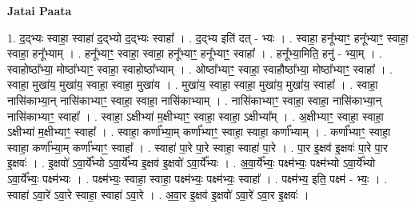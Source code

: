 \documentclass[17pt]{extarticle}
\begin{document}
\textbf{Jatai Paata} \newline

1. द॒द्भ्यः स्वाहा॒ स्वाहा॑ द॒द्भ्यो द॒द्भ्यः स्वाहा᳚ । . द॒द्भ्य इति॑ दत् - भ्यः । . स्वाहा॒ हनू᳚भ्याꣳ॒॒ हनू᳚भ्याꣳ॒॒ स्वाहा॒ स्वाहा॒ हनू᳚भ्याम् । . हनू᳚भ्याꣳ॒॒ स्वाहा॒ स्वाहा॒ हनू᳚भ्याꣳ॒॒ हनू᳚भ्याꣳ॒॒ स्वाहा᳚ । . हनू᳚भ्या॒मिति॒ हनु॑ - भ्या॒म् । . स्वाहोष्ठा᳚भ्या॒ मोष्ठा᳚भ्याꣳ॒॒ स्वाहा॒ स्वाहोष्ठा᳚भ्याम् । . ओष्ठा᳚भ्याꣳ॒॒ स्वाहा॒ स्वाहौष्ठा᳚भ्या॒ मोष्ठा᳚भ्याꣳ॒॒ स्वाहा᳚ । . स्वाहा॒ मुखा॑य॒ मुखा॑य॒ स्वाहा॒ स्वाहा॒ मुखा॑य । . मुखा॑य॒ स्वाहा॒ स्वाहा॒ मुखा॑य॒ मुखा॑य॒ स्वाहा᳚ । . स्वाहा॒ नासि॑काभ्या॒न् नासि॑काभ्याꣳ॒॒ स्वाहा॒ स्वाहा॒ नासि॑काभ्याम् । . नासि॑काभ्याꣳ॒॒ स्वाहा॒ स्वाहा॒ नासि॑काभ्या॒न् नासि॑काभ्याꣳ॒॒ स्वाहा᳚ । . स्वाहा॒ ऽक्षीभ्या॑ म॒क्षीभ्याꣳ॒॒ स्वाहा॒ स्वाहा॒ ऽक्षीभ्या᳚म् । . अ॒क्षीभ्याꣳ॒॒ स्वाहा॒ स्वाहा॒ ऽक्षीभ्या॑ म॒क्षीभ्याꣳ॒॒ स्वाहा᳚ । . स्वाहा॒ कर्णा᳚भ्या॒म् कर्णा᳚भ्याꣳ॒॒ स्वाहा॒ स्वाहा॒ कर्णा᳚भ्याम् । . कर्णा᳚भ्याꣳ॒॒ स्वाहा॒ स्वाहा॒ कर्णा᳚भ्या॒म् कर्णा᳚भ्याꣳ॒॒ स्वाहा᳚ । . स्वाहा॑ पा॒रे पा॒रे स्वाहा॒ स्वाहा॑ पा॒रे । . पा॒र इ॒क्षव॑ इ॒क्षवः॑ पा॒रे पा॒र इ॒क्षवः॑ । . इ॒क्षवो॑ ऽवा॒र्ये᳚भ्यो ऽवा॒र्ये᳚भ्य इ॒क्षव॑ इ॒क्षवो॑ ऽवा॒र्ये᳚भ्यः । . अ॒वा॒र्ये᳚भ्यः॒ पक्ष्म॑भ्यः॒ पक्ष्म॑भ्यो ऽवा॒र्ये᳚भ्यो ऽवा॒र्ये᳚भ्यः॒ पक्ष्म॑भ्यः । . पक्ष्म॑भ्यः॒ स्वाहा॒ स्वाहा॒ पक्ष्म॑भ्यः॒ पक्ष्म॑भ्यः॒ स्वाहा᳚ । . पक्ष्म॑भ्य॒ इति॒ पक्ष्म॑ - भ्यः॒ । . स्वाहा॑ ऽवा॒रे॑ ऽवा॒रे स्वाहा॒ स्वाहा॑ ऽवा॒रे । . अ॒वा॒र इ॒क्षव॑ इ॒क्षवो॑ ऽवा॒रे॑ ऽवा॒र इ॒क्षवः॑ । \newline
\end{document}
